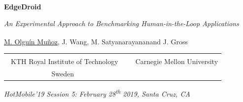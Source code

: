 \documentclass[aspectratio=1610]{beamer}
\newcommand{\kthaffil}{\textsuperscript{\textdagger}}
\newcommand{\cmuaffil}{\textsuperscript{\textdaggerdbl}}
\begin{document}
\startpage
\begin{frame}{}
    \begin{center}
        \begin{LARGE}
            \textbf{EdgeDroid}\\
        \end{LARGE}
        \emph{An Experimental Approach to Benchmarking Human-in-the-Loop Applications}\\
        \vspace{0.02\textheight}
        {%
            \footnotesize%
            \underline{M. Olguín Muñoz}\kthaffil, J. Wang\cmuaffil, M. Satyanarayanan\cmuaffil and J. Gross\kthaffil\\
            \vspace{0.02\textheight}
            \begin{tabular}{@{}ccc@{}}
                \kthaffil~KTH Royal Institute of Technology
                & & \cmuaffil~Carnegie Mellon University\\
                Sweden & &     
            \end{tabular}
        }
    \end{center}

    \vspace{0.04\textheight}

    \begin{tiny}
        \raggedleft%
        \emph{HotMobile'19 Session 5: February 28\textsuperscript{th} 2019, Santa Cruz, CA}\\
    \end{tiny}
\end{frame}

\normalpage%
\end{document}
